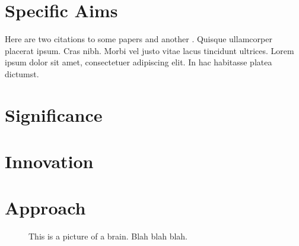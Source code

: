 \documentclass[11pt,letterpaper]{article}
\begin{document}
\section*{Specific Aims}

Here are two citations to some papers
\cite{HODGKIN:1952aa,HODGKIN:1952ab,Hodgkin:1947aa} and another
\cite{Hodgkin:1990aa}. Quisque ullamcorper placerat ipsum. Cras
nibh. Morbi vel justo vitae lacus tincidunt ultrices. Lorem ipsum
dolor sit amet, consectetuer adipiscing elit. In hac habitasse platea
dictumst.

\lipsum[1-7]

\newpage

\section*{Significance}

\lipsum[1-9]

\section*{Innovation}

\lipsum[1-5]

\section*{Approach}

\lipsum[1]

\begin{figure}
  \centering
  \vspace{-0.3in}
  \caption{This is a picture of a brain. Blah blah blah.}
  \vspace{-0.3in}
  \label{fig:brain}
\end{figure}

\lipsum[10-18]



\end{document}
